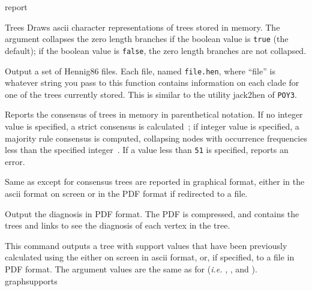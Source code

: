 \begin{command}{report}{}
\begin{arguments}
\begin{argumentgroup}{Trees}
                {Draws ascii character representations of trees stored in memory. The
                argument  collapses the zero length branches if
                the boolean value is \texttt{true} (the default); if the boolean value is
                \texttt{false}, the zero length branches are not collapsed.}
				{}

	            {Output a set of Hennig86 files. Each file, named \texttt{file.hen},
                where ``file'' is whatever string you pass to this function
                contains information on each clade for one of the trees
                currently stored. This is similar to the utility jack2hen 
                of \texttt{POY3}.}
				{}

                {Reports the consensus of trees in memory in parenthetical notation.
                If no integer value is
                specified, a strict consensus is calculated~\cite{rohlf1982};
                if integer value is specified,
                a majority rule consensus is computed, collapsing nodes with
                occurrence frequencies less than the specified integer~\cite{margush1981}.
                If a value less
                than \texttt{51} is specified, \poy reports an error.} 
                {}

                {Same as  except for consensus trees are
                reported in graphical format, either in the ascii format on
                screen or in the PDF format if redirected to a file.}
                {}

                {Output the diagnosis in PDF format. The PDF is compressed, and
                contains the trees and links to see the diagnosis of each vertex
                in the tree.}
                {}

                {This command outputs a tree with support values that have
                been previously calculated using the
                 either on screen
                in ascii format, or, if specified, to a file in PDF
                format. The argument values are the same as for 
                 (\emph{i.e.} ,
                , and ).} 
                {graphsupports}


\end{argumentgroup}
\end{arguments}
\end{command}
